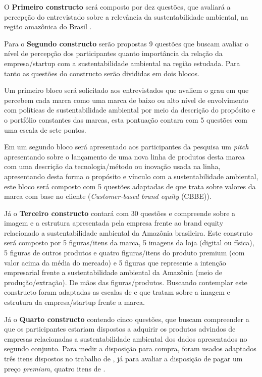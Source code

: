 O \textbf{Primeiro constructo} será composto por dez questões, que avaliará a percepção do entrevistado sobre a relevância da sustentabilidade ambiental, na região amazônica do Brasil \cite{Ricks_J}. 


Para o \textbf{Segundo constructo} serão propostas 9 questões que buscam avaliar o nível de percepção dos participantes quanto importância da relação da empresa/startup com a sustentabilidade ambiental na região estudada. Para tanto as questões do constructo serão divididas em dois blocos. 

Um primeiro bloco será solicitado aos entrevistados que avaliem o grau em que percebem cada marca como uma marca de baixo ou alto nível de envolvimento com políticas de sustentabilidade ambiental por meio da descrição do propósito e o portfólio constantes das marcas, esta pontuação contara com  5 questões com uma escala de sete pontos. 

Em um segundo bloco será apresentado aos participantes da pesquisa um \textit{pitch} apresentando sobre o lançamento de uma nova linha de produtos desta marca com uma descrição da tecnologia/método ou inovação usada na linha, apresentando desta forma o propósito e vínculo com a sustentabilidade ambiental, este bloco será composto com 5 questões adaptadas de  que trata sobre valores da marca com base no cliente (\textit{Customer-based brand equity} (CBBE)).

Já o \textbf{Terceiro constructo} contará com 30 questões e compreende sobre a imagem e a estrutura apresentada pela empresa frente ao brand equity relacionado a sustentabilidade ambiental da Amazônia brasileira. Este construto será composto por 5 figuras/itens da marca, 5 imagens da loja (digital ou física), 5 figuras de outros produtos e quatro figuras/itens do produto premium (com valor acima da média do mercado) e 5 figuras que represente a intenção empresarial frente a sustentabilidade ambiental da Amazônia (meio de produção/extração). De mãos das figuras/produtos. Buscando contemplar este constructo foram adaptadas as escalas de  e  que tratam sobre a imagem e estrutura da empresa/startup frente a marca.

Já o \textbf{Quarto constructo} contendo cinco questões, que buscam compreender a que os participantes estariam dispostos a adquirir os produtos advindos de empresas relacionadas a sustentabilidade ambiental dos dados apresentados no segundo conjunto. Para medir a disposição para compra, foram usados adaptados três itens dispostos no trabalho de , já para avaliar a disposição de pagar um preço \textit{premium}, quatro itens de .


